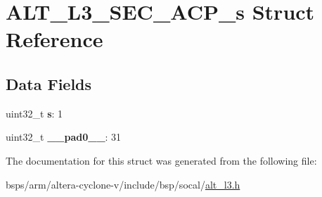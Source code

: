 \hypertarget{structALT__L3__SEC__ACP__s}{}\section{A\+L\+T\+\_\+\+L3\+\_\+\+S\+E\+C\+\_\+\+A\+C\+P\+\_\+s Struct Reference}
\label{structALT__L3__SEC__ACP__s}
\subsection*{Data Fields}
\begin{DoxyCompactItemize}
\item 
\mbox{\label{structALT__L3__SEC__ACP__s_a28288f1a8ae3663d7029a3d6e335d5ce}} 
uint32\+\_\+t {\bfseries s}\+: 1
\item 
\mbox{\label{structALT__L3__SEC__ACP__s_acfd0c28fe4fdef2c59c349edce937951}} 
uint32\+\_\+t {\bfseries \+\_\+\+\_\+pad0\+\_\+\+\_\+}\+: 31
\end{DoxyCompactItemize}


The documentation for this struct was generated from the following file\+:\begin{DoxyCompactItemize}
\item 
bsps/arm/altera-\/cyclone-\/v/include/bsp/socal/\mbox{\hyperlink{alt__l3_8h}{alt\+\_\+l3.\+h}}\end{DoxyCompactItemize}
